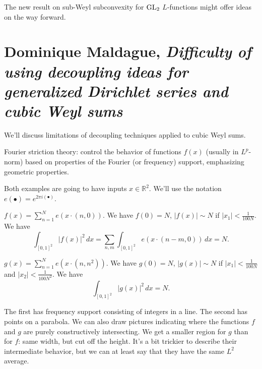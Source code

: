 \documentclass[reqno]{amsart} 
\numberwithin{theorem}{section}
\numberwithin{equation}{section}
\begin{document}
The new result on sub-Weyl subconvexity for $\operatorname{GL}_2$ $L$-functions might offer ideas on the way forward.

\section{Dominique Maldague, \textnormal{\emph{Difficulty of using decoupling ideas for generalized Dirichlet series and cubic Weyl sums}}}

We'll discuss limitations of decoupling techniques applied to cubic Weyl sums.

Fourier striction theory: control the behavior of functions $f(x)$ (usually in $L^p$-norm) based on properties of the Fourier (or frequency) support, emphasizing geometric properties.

Both examples are going to have inputs $x \in \mathbb{R}^2$.  We'll use the notation $e(\bullet) = e^{2 \pi i(\bullet)}$.

\begin{example}
  $f(x) = \sum_{n = 1}^N e(x \cdot(n, 0))$.  We have $f(0) = N$, $\lvert f(x) \rvert \sim N$ if $\lvert x_1 \rvert < \frac{1}{100 N}$.  We have
  \begin{equation*}
    \int_{[0, 1]^2} \lvert f(x) \rvert^2 \, d x
    =
    \sum_{n, m} \int_{[0, 1]^2}
    e \left( x \cdot(n - m, 0) \right) \, d x = N.
  \end{equation*}

\end{example}


\begin{example}
  $g(x) = \sum_{n = 1}^{N} e(x \cdot(n, n^2))$.  We have $g(0) = N$, $\lvert g(x) \rvert \sim N$ if $\lvert x_1 \rvert < \frac{1}{100 N}$ and $\lvert x_2 \rvert < \frac{1}{100 N^2}$.  We have
  \begin{equation*}
    \int_{[0, 1]^2} \lvert g(x) \rvert^2 \, d x = N.
  \end{equation*}
\end{example}

The first has frequency support consisting of integers in a line.  The second has points on a parabola.  We can also draw pictures indicating where the functions $f$ and $g$ are purely constructively intersecting.  We get a smaller region for $g$ than for $f$: same width, but cut off the height.  It's a bit trickier to describe their intermediate behavior, but we can at least say that they have the same $L^2$ average.
\end{document}
